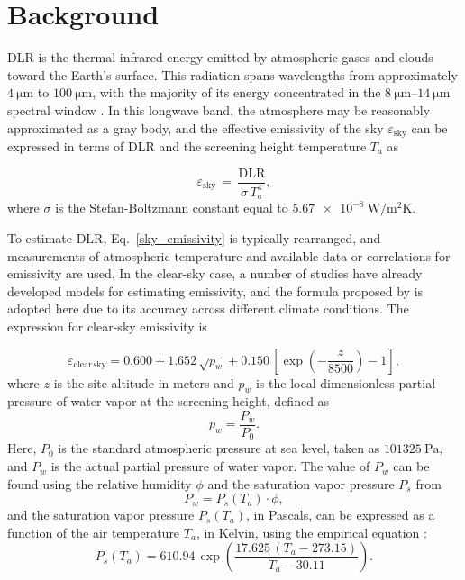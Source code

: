 \documentclass[preprint,12pt]{elsarticle}
\begin{document}
\section{Background}
DLR is the thermal infrared energy emitted by atmospheric gases and clouds toward the Earth’s surface. This radiation spans wavelengths from approximately $\SI{4}{\micro\meter}$ to $\SI{100}{\micro\meter}$, with the majority of its energy concentrated in the $\SIrange{8}{14}{\micro\meter}$ spectral window \cite{kiehl1997earth}. In this longwave band, the atmosphere may be reasonably approximated as a gray body, and the effective emissivity of the sky $\varepsilon_{\mathrm{sky}}$ can be expressed in terms of DLR and the screening height temperature $T_a$ as \cite{brunt1932notes,matsunobu2024effective,berdahl2021retrospective}

\begin{equation} \label{sky_emissivity}
\varepsilon_{\mathrm{sky}} \, = \, \frac{\mathrm{DLR}}{\sigma\,T_a^4},
\end{equation}
where $\sigma$ is the Stefan-Boltzmann constant equal to $\SI{5.67e-8}{\watt\per\meter^{2}\kelvin}$. 

To estimate DLR, Eq.~\eqref{sky_emissivity} is typically rearranged, and measurements of atmospheric temperature and available data or correlations for emissivity are used. In the clear-sky case, a number of studies have already developed models for estimating emissivity, and the formula proposed by \cite{matsunobu2024effective} is adopted here due to its accuracy across different climate conditions. The expression for clear-sky emissivity is 

\begin{equation} \label{e_clear sky}
    \varepsilon_{\mathrm{clear\,sky}} =  0.600 + 1.652 \, \sqrt{p_w} + 0.150 \, \left[ \exp\left( -\frac{z}{8500} \right) - 1 \right],
\end{equation}
where $z$ is the site altitude in meters and $p_w$ is the local dimensionless partial pressure of water vapor at the screening height, defined as 
\begin{equation}
     p_{w} = \frac{P_{w}}{P_{0}}.
\end{equation}
Here, $P_0$ is the standard atmospheric pressure at sea level, taken as $\SI{101325}{\pascal}$, and $P_{w}$ is the actual partial pressure of water vapor. The value of $P_w$ can be found using the relative humidity $\phi$ and the saturation vapor pressure $P_s$ from
\begin{equation}
   P_w = P_s(T_a) \cdot \phi,
\end{equation}
and the saturation vapor pressure $P_s(T_a)$, in Pascals, can be expressed as a function of the air temperature $T_a$, in Kelvin, using the empirical equation \citep{alduchov1996improved}: 
\begin{equation}
   P_s(T_a) = 610.94 \, \exp \left( \frac{17.625 \,(T_a - 273.15)}{T_a - 30.11 } \right).
\end{equation}
\end{document}
